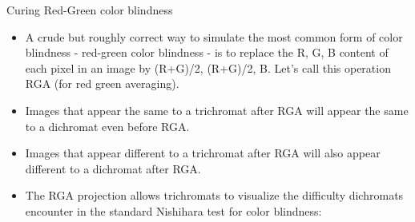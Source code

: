 \documentclass{beamer}
\begin{document}
\begin{frame}{Curing Red-Green color blindness}
   \begin{itemize}
      \item A crude but roughly correct way to simulate the most common form of color blindness - red-green color blindness - is to replace the {R, G, B} content of each pixel in an image by { (R+G)/2, (R+G)/2, B}. Let’s call this operation RGA (for red green averaging).
      \item Images that appear the same to a trichromat after RGA will appear the same to a dichromat even before RGA.
      \item Images that appear different to a trichromat after RGA will also appear different to a dichromat after RGA.
      \item The RGA projection allows trichromats to visualize the difficulty dichromats encounter in the standard Nishihara test for color blindness:
   \end{itemize}
\end{frame}
\end{document}
